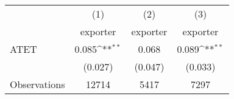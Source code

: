 {
\def\sym#1{\ifmmode^{#1}\else\(^{#1}\)\fi}
\begin{tabular}{l*{3}{c}}
\hline\hline
                    &\multicolumn{1}{c}{(1)}&\multicolumn{1}{c}{(2)}&\multicolumn{1}{c}{(3)}\\
                    &\multicolumn{1}{c}{exporter}&\multicolumn{1}{c}{exporter}&\multicolumn{1}{c}{exporter}\\
\hline
ATET                &       0.085\sym{**} &       0.068         &       0.089\sym{**} \\
                    &     (0.027)         &     (0.047)         &     (0.033)         \\
\hline
Observations        &       12714         &        5417         &        7297         \\
\hline\hline
\end{tabular}
}
